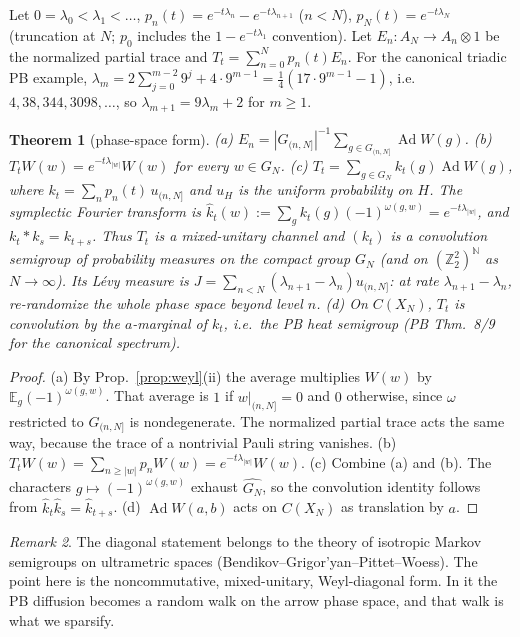 \documentclass[11pt]{article}
\newtheorem{theorem}{Theorem}[section]
\theoremstyle{definition}
\theoremstyle{remark}
\newtheorem{remark}[theorem]{Remark}
\newcommand{\Z}{\mathbb Z}
\newcommand{\N}{\mathbb N}
\newcommand{\E}{\mathbb E}
\newcommand{\Ad}{\operatorname{Ad}}
\newcommand{\dep}[1]{|#1|}
\begin{document}
Let $0=\lambda_0<\lambda_1<\dots$, $p_n(t)=e^{-t\lambda_n}-e^{-t\lambda_{n+1}}$ ($n<N$), $p_N(t)=e^{-t\lambda_N}$ (truncation at $N$; $p_0$ includes the $1-e^{-t\lambda_1}$ convention). Let $E_n:A_N\to A_n\otimes 1$ be the normalized partial trace and $T_t=\sum_{n=0}^N p_n(t)E_n$. For the canonical triadic PB example, $\lambda_m=2\sum_{j=0}^{m-2}9^j+4\cdot 9^{m-1}=\tfrac14(17\cdot 9^{m-1}-1)$, i.e.\ $4,38,344,3098,\dots$, so $\lambda_{m+1}=9\lambda_m+2$ for $m\ge1$.

\begin{theorem}[phase-space form]\label{thm:levy}
(a) $E_n=|G_{(n,N]}|^{-1}\sum_{g\in G_{(n,N]}}\Ad W(g)$.
(b) $T_tW(w)=e^{-t\lambda_{\dep w}}W(w)$ for every $w\in G_N$.
(c) $T_t=\sum_{g\in G_N}k_t(g)\Ad W(g)$, where $k_t=\sum_np_n(t)\,u_{(n,N]}$ and $u_H$ is the uniform probability on $H$. The symplectic Fourier transform is $\hat k_t(w):=\sum_gk_t(g)(-1)^{\omega(g,w)}=e^{-t\lambda_{\dep w}}$, and $k_t*k_s=k_{t+s}$. Thus $T_t$ is a mixed-unitary channel and $(k_t)$ is a convolution semigroup of probability measures on the compact group $G_N$ (and on $(\Z_2^2)^{\N}$ as $N\to\infty$). Its L\'evy measure is $J=\sum_{n<N}(\lambda_{n+1}-\lambda_n)u_{(n,N]}$: \emph{at rate $\lambda_{n+1}-\lambda_n$, re-randomize the whole phase space beyond level $n$.}
(d) On $C(X_N)$, $T_t$ is convolution by the $a$-marginal of $k_t$, i.e.\ the PB heat semigroup (PB Thm.~8/9 for the canonical spectrum).
\end{theorem}

\begin{proof}
(a) By Prop.~\ref{prop:weyl}(ii) the average multiplies $W(w)$ by $\E_g(-1)^{\omega(g,w)}$. That average is $1$ if $w|_{(n,N]}=0$ and $0$ otherwise, since $\omega$ restricted to $G_{(n,N]}$ is nondegenerate. The normalized partial trace acts the same way, because the trace of a nontrivial Pauli string vanishes. (b) $T_tW(w)=\sum_{n\ge\dep w}p_n W(w)=e^{-t\lambda_{\dep w}}W(w)$. (c) Combine (a) and (b). The characters $g\mapsto(-1)^{\omega(g,w)}$ exhaust $\widehat{G_N}$, so the convolution identity follows from $\hat k_t\hat k_s=\hat k_{t+s}$. (d) $\Ad W(a,b)$ acts on $C(X_N)$ as translation by $a$.
\end{proof}

\begin{remark}
The diagonal statement belongs to the theory of isotropic Markov semigroups on ultrametric spaces (Bendikov--Grigor'yan--Pittet--Woess). The point here is the noncommutative, mixed-unitary, Weyl-diagonal form. In it the PB diffusion becomes a random walk on the arrow phase space, and that walk is what we sparsify.
\end{remark}
\end{document}
